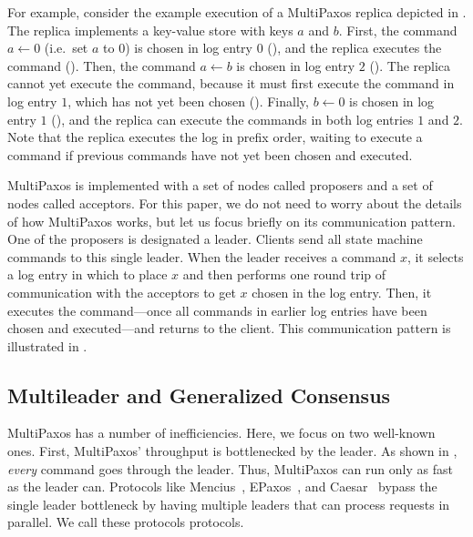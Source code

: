 For example, consider the example execution of a MultiPaxos replica depicted in
. The replica implements a key-value store
with keys $a$ and $b$. First, the command $a \gets 0$ (i.e.\ set $a$ to $0$) is
chosen in log entry $0$ (), and the replica
executes the command (). Then, the command
$a \gets b$ is chosen in log entry $2$ ().
The replica cannot yet execute the command, because it must first execute the
command in log entry $1$, which has not yet been chosen
().  Finally, $b \gets 0$ is chosen in log
entry $1$ (), and the replica can execute
the commands in both log entries $1$ and $2$. Note that the replica executes
the log in prefix order, waiting to execute a command if previous commands have
not yet been chosen and executed.

{}

MultiPaxos is implemented with a set of nodes called proposers and a set of
nodes called acceptors. For this paper, we do not need to worry about the
details of how MultiPaxos works, but let us focus briefly on its communication
pattern. One of the proposers is designated a leader. Clients send all state
machine commands to this single leader. When the leader receives a command $x$,
it selects a log entry in which to place $x$ and then performs one round trip
of communication with the acceptors to get $x$ chosen in the log entry. Then,
it executes the command---once all commands in earlier log entries have been
chosen and executed---and returns to the client.  This communication pattern is
illustrated in .

{}

\subsection{Multileader and Generalized Consensus}
MultiPaxos has a number of inefficiencies. Here, we focus on two well-known
ones. First, MultiPaxos' throughput is bottlenecked by the leader. As shown in
, \emph{every} command goes through the leader.
Thus, MultiPaxos can run only as fast as the leader can. Protocols like
Mencius~\cite{mao2008mencius}, EPaxos~\cite{moraru2013there}, and
Caesar~\cite{arun2017speeding} bypass the single leader bottleneck by having
multiple leaders that can process requests in parallel. We call these protocols
 protocols.

